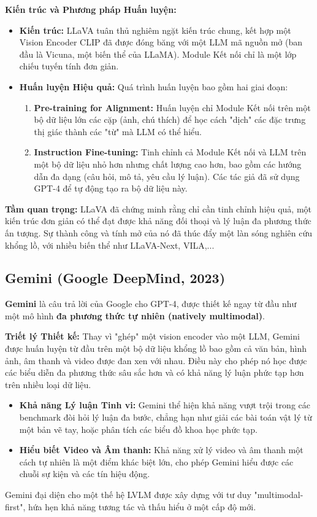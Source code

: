 \textbf{Kiến trúc và Phương pháp Huấn luyện:}
\begin{itemize}
	\item \textbf{Kiến trúc:} LLaVA tuân thủ nghiêm ngặt kiến trúc chung, kết hợp một Vision Encoder CLIP đã được đóng băng với một LLM mã nguồn mở (ban đầu là Vicuna, một biến thể của LLaMA). Module Kết nối chỉ là một lớp chiếu tuyến tính đơn giản.
	\item \textbf{Huấn luyện Hiệu quả:} Quá trình huấn luyện bao gồm hai giai đoạn:
	\begin{enumerate}
		\item \textbf{Pre-training for Alignment:} Huấn luyện chỉ Module Kết nối trên một bộ dữ liệu lớn các cặp (ảnh, chú thích) để học cách "dịch" các đặc trưng thị giác thành các "từ" mà LLM có thể hiểu.
		\item \textbf{Instruction Fine-tuning:} Tinh chỉnh cả Module Kết nối và LLM trên một bộ dữ liệu nhỏ hơn nhưng chất lượng cao hơn, bao gồm các hướng dẫn đa dạng (câu hỏi, mô tả, yêu cầu lý luận). Các tác giả đã sử dụng GPT-4 để tự động tạo ra bộ dữ liệu này.
	\end{enumerate}
\end{itemize}
\textbf{Tầm quan trọng:} LLaVA đã chứng minh rằng chỉ cần tinh chỉnh hiệu quả, một kiến trúc đơn giản có thể đạt được khả năng đối thoại và lý luận đa phương thức ấn tượng. Sự thành công và tính mở của nó đã thúc đẩy một làn sóng nghiên cứu khổng lồ, với nhiều biến thể như LLaVA-Next, VILA,...

\subsection{Gemini (Google DeepMind, 2023)}
\label{subsec:gemini}
\textbf{Gemini} \cite{GeminiTeam2023} là câu trả lời của Google cho GPT-4, được thiết kế ngay từ đầu như một mô hình \textbf{đa phương thức tự nhiên (natively multimodal)}.

\textbf{Triết lý Thiết kế:}
Thay vì "ghép" một vision encoder vào một LLM, Gemini được huấn luyện từ đầu trên một bộ dữ liệu khổng lồ bao gồm cả văn bản, hình ảnh, âm thanh và video được đan xen với nhau. Điều này cho phép nó học được các biểu diễn đa phương thức sâu sắc hơn và có khả năng lý luận phức tạp hơn trên nhiều loại dữ liệu.
\begin{itemize}
	\item \textbf{Khả năng Lý luận Tinh vi:} Gemini thể hiện khả năng vượt trội trong các benchmark đòi hỏi lý luận đa bước, chẳng hạn như giải các bài toán vật lý từ một bản vẽ tay, hoặc phân tích các biểu đồ khoa học phức tạp.
	\item \textbf{Hiểu biết Video và Âm thanh:} Khả năng xử lý video và âm thanh một cách tự nhiên là một điểm khác biệt lớn, cho phép Gemini hiểu được các chuỗi sự kiện và các tín hiệu động.
\end{itemize}
Gemini đại diện cho một thế hệ LVLM được xây dựng với tư duy "multimodal-first", hứa hẹn khả năng tương tác và thấu hiểu ở một cấp độ mới.

